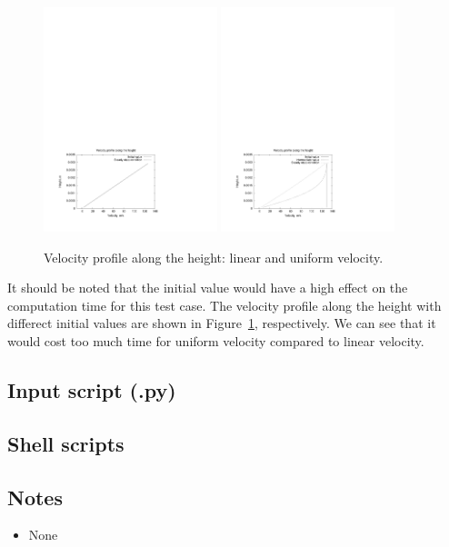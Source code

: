 \begin{figure}[htbp]
\begin{center}
\includegraphics[width=0.45\textwidth,viewport=39 52 414 298,clip=true]{../3D/couette-flow/c_3D_linear.pdf}
\includegraphics[width=0.45\textwidth,viewport=39 52 414 298,clip=true]{../3D/couette-flow/c_3D_uniform.pdf}
\end{center}
\caption{Velocity profile along the height: linear and uniform velocity.}
   \label{couette3-linearuniform-fig}
\end{figure}

\medskip
It should be noted that the initial value would have a high effect on the computation time 
for this test case. The velocity profile along the height with differect initial values are 
shown in Figure~\ref{couette3-linearuniform-fig}, respectively. We can see that it would cost too much time for
uniform velocity compared to linear velocity.

\newpage
\subsection{Input script (.py)}
\topbar

\bottombar


\subsection{Shell scripts}
\label{couette-flow-3D-sh-files}
\topbar

\bottombar

\subsection{Notes}
\begin{itemize}
\item None
\end{itemize}


